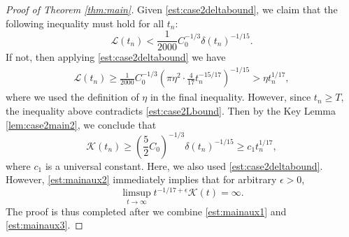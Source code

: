 \documentclass[11pt]{article}
\numberwithin{equation}{section}
\newcommand{\eps}{\epsilon}
\newcommand{\calL}{\mathcal{L}}
\newcommand{\calK}{\mathcal{K}}
\begin{document}
\begin{proof}[Proof of Theorem \ref{thm:main}]
    Given \eqref{est:case2deltabound}, we claim that the following inequality must hold for all $t_n$:
    \begin{equation}
        \label{est:case2Lbound2}
        \calL(t_n) < \frac{1}{2000}C_0^{-1/3}\delta(t_n)^{-1/15}.
    \end{equation}
    If not, then applying \eqref{est:case2deltabound} we have
    \begin{align*}
        \calL(t_n) \ge \frac{1}{2000}C_0^{-1/3}\left(\pi\eta^2\cdot \frac{4}{17}t_n^{-15/17}\right)^{-1/15} > \eta t_n^{1/17},
    \end{align*}
    where we used the definition of $\eta$ in the final inequality. However, since $t_n \ge T$, the inequality above contradicts \eqref{est:case2Lbound}. Then by the Key Lemma \ref{lem:case2main2}, we conclude that
    \begin{equation}\label{est:mainaux2}
    \calK(t_n) \ge \left({\frac{5}{2}}C_0\right)^{-1/3}\delta(t_n)^{-1/15} \ge c_1 t_n^{1/17},
    \end{equation}
    where $c_1$ is a universal constant. Here, we also used \eqref{est:case2deltabound}. However, \eqref{est:mainaux2} immediately implies that for arbitrary $\eps > 0$,
    \begin{equation}
        \label{est:mainaux3}
        \limsup_{t\to\infty}t^{-1/17+\eps}\calK(t) = \infty.
    \end{equation}
    The proof is thus completed after we combine \eqref{est:mainaux1} and \eqref{est:mainaux3}.
\end{proof}
\end{document}

